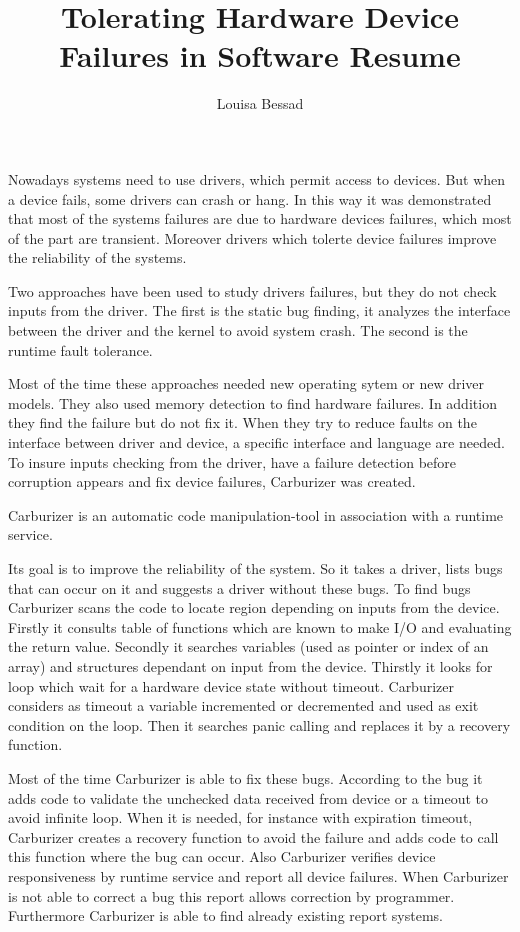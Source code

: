 \documentclass[11pt]{article}
\title{\textbf{Tolerating Hardware Device Failures in Software Resume}}
\author{Louisa Bessad}
\begin{document}
\maketitle

Nowadays systems need to use drivers, which permit access to devices. But when a device fails, some drivers can crash or hang. In this way it was demonstrated that most of the systems failures are due to hardware devices failures, which most of the part are transient. Moreover drivers which tolerte device failures improve the reliability of the systems. 

Two approaches have been used to study drivers failures, but they do not check inputs from the driver. The first is the static bug finding, it analyzes the interface between the driver and the kernel to avoid system crash. The second is the runtime fault tolerance.

Most of the time these approaches needed new operating sytem or new driver models. They also used memory detection to find hardware failures. In addition they find the failure but do not fix it. When they try to reduce faults on the interface between driver and device, a specific interface and language are needed. To insure inputs checking from the driver, have a failure detection before corruption appears and fix device failures, Carburizer was created.

\vspace{0.5cm}
Carburizer is an automatic code manipulation-tool in association with a runtime service.

Its goal is to improve the reliability of the system. So it takes a driver, lists bugs that can occur on it and suggests a driver without these bugs.
To find bugs Carburizer scans the code to locate region depending on inputs from the device. Firstly it consults table of functions which are known to make I/O and evaluating the return value. Secondly it searches variables (used as pointer or index of an array) and structures dependant on input from the device. Thirstly it looks for loop which wait for a hardware device state without timeout. Carburizer considers as timeout a variable incremented or decremented and used as exit condition on the loop. Then it searches panic calling and replaces it by a recovery function.

Most of the time Carburizer is able to fix these bugs. According to the bug it adds code to validate the unchecked data received from device or a timeout to avoid infinite loop. When it is needed, for instance with expiration timeout, Carburizer creates a recovery function to avoid the failure and adds code to  call this function where the bug can occur.
Also Carburizer verifies device responsiveness by runtime service and report all device failures. When Carburizer is not able to correct a bug this report allows correction by programmer. Furthermore Carburizer is able to find already existing report systems.
\end{document}
